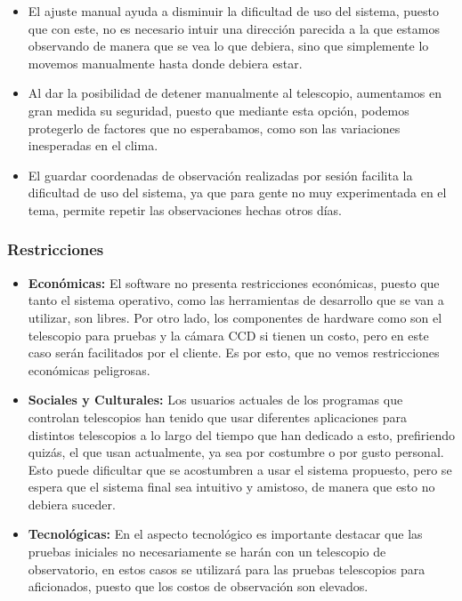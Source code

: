 \documentclass[letterpaper,titlepage,spanish,10pt]{article}
\begin{document}
\begin{itemize}
	\item El ajuste manual ayuda a disminuir la dificultad de uso del sistema, 
puesto que con este, no es necesario intuir una direcci\'on parecida a la que 
estamos observando de manera que se vea lo que debiera, sino que simplemente 
lo movemos manualmente hasta donde debiera estar.

	\item Al dar la posibilidad de detener manualmente al telescopio, aumentamos 
en gran medida su seguridad, puesto que mediante esta opci\'on, podemos protegerlo 
de factores que no esperabamos, como son las variaciones inesperadas en el clima. 

	\item El guardar coordenadas de observaci\'on realizadas por sesi\'on facilita 
la dificultad de uso del sistema, ya que para gente no muy experimentada en el tema, 
permite repetir las observaciones hechas otros d\'ias.

	\end{itemize}

\subsubsection{Restricciones}

\begin{itemize}

\item \textbf{Econ\'omicas:} El software no presenta restricciones econ\'omicas, 
puesto que tanto el sistema operativo, como las herramientas de desarrollo que se 
van a utilizar, son libres. Por otro lado, los componentes de hardware como son 
el telescopio para pruebas y la c\'amara CCD si tienen un costo, pero en este caso 
ser\'an facilitados por el cliente. Es por esto, que no vemos restricciones 
econ\'omicas peligrosas.

\item \textbf{Sociales y Culturales:} Los usuarios actuales de los programas que 
controlan telescopios han tenido que usar diferentes aplicaciones para distintos 
telescopios a lo largo del tiempo que han dedicado a esto, prefiriendo quiz\'as, 
el que usan actualmente, ya sea por costumbre o por gusto personal. Esto puede 
dificultar que se acostumbren a usar el sistema propuesto, pero se espera que el 
sistema final sea intuitivo y amistoso, de manera que esto no debiera suceder.

\item \textbf{Tecnol\'ogicas:} En el aspecto tecnol\'ogico es importante destacar 
que las pruebas iniciales no necesariamente se har\'an con un telescopio de 
observatorio, en estos casos se utilizar\'a para las pruebas telescopios para 
aficionados, puesto que los costos de observaci\'on son elevados.



\end{itemize}
\end{document}
